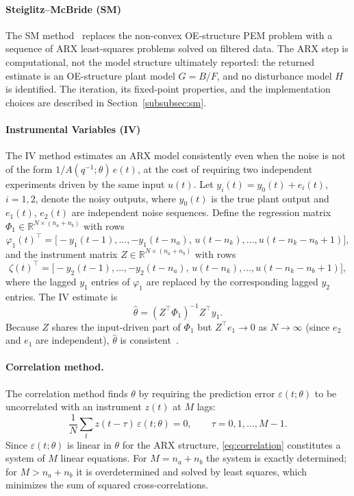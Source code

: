 \documentclass[acmsmall,screen,review]{acmart}
\begin{document}
\paragraph{Steiglitz--McBride (SM)}
The SM method~\cite{steiglitz1965} replaces the non-convex OE-structure PEM
problem with a sequence of ARX least-squares problems solved on filtered
data.  The ARX step is computational, not the model structure ultimately
reported: the returned estimate is an OE-structure plant model \(G=B/F\),
and no disturbance model \(H\) is identified.  The iteration, its
fixed-point properties, and the implementation choices are described in
Section~\ref{subsubsec:sm}.

\paragraph{Instrumental Variables (IV)}
The IV method estimates an ARX model consistently even when the noise
is not of the form $1/A(q^{-1};\theta)\,e(t)$, at the cost of requiring two
independent experiments driven by the same input $u(t)$.  Let
$y_i(t) = y_0(t) + e_i(t)$, $i = 1,2$, denote the noisy outputs, where
$y_0(t)$ is the true plant output and $e_1(t)$, $e_2(t)$ are independent
noise sequences.  Define the regression matrix
$\Phi_1 \in \mathbb{R}^{N \times (n_a+n_b)}$ with rows
\[
  \varphi_1(t)^\top = \bigl[-y_1(t-1),\ldots,-y_1(t-n_a),\,
                             u(t-n_k),\ldots,u(t-n_k-n_b+1)\bigr],
\]
and the instrument matrix $Z \in \mathbb{R}^{N \times (n_a+n_b)}$ with rows
\[
  \zeta(t)^\top = \bigl[-y_2(t-1),\ldots,-y_2(t-n_a),\,
                         u(t-n_k),\ldots,u(t-n_k-n_b+1)\bigr],
\]
where the lagged $y_1$ entries of $\varphi_1$ are replaced by the
corresponding lagged $y_2$ entries.  The IV estimate is
\begin{equation}
    \hat{\theta} = (Z^\top \Phi_1)^{-1} Z^\top y_1.
    \label{eq:iv}
\end{equation}
Because $Z$ shares the input-driven part of $\Phi_1$ but $Z^\top e_1 \to 0$
as $N \to \infty$ (since $e_2$ and $e_1$ are independent),
$\hat{\theta}$ is consistent~\cite{soderstrom1989}.

\paragraph{Correlation method.}
The correlation method finds $\theta$ by requiring the prediction error
$\varepsilon(t;\theta)$ to be uncorrelated with an instrument $z(t)$ at
$M$ lags:
\begin{equation}
    \frac{1}{N}\sum_t z(t-\tau)\,\varepsilon(t;\theta) = 0,
    \qquad \tau = 0,1,\ldots,M-1.
    \label{eq:correlation}
\end{equation}
Since $\varepsilon(t;\theta)$ is linear in $\theta$ for the ARX structure,
\eqref{eq:correlation} constitutes a system of $M$ linear equations.
For $M = n_a + n_b$ the system is exactly determined; for $M > n_a + n_b$
it is overdetermined and solved by least squares, which minimizes the sum
of squared cross-correlations.
\end{document}
